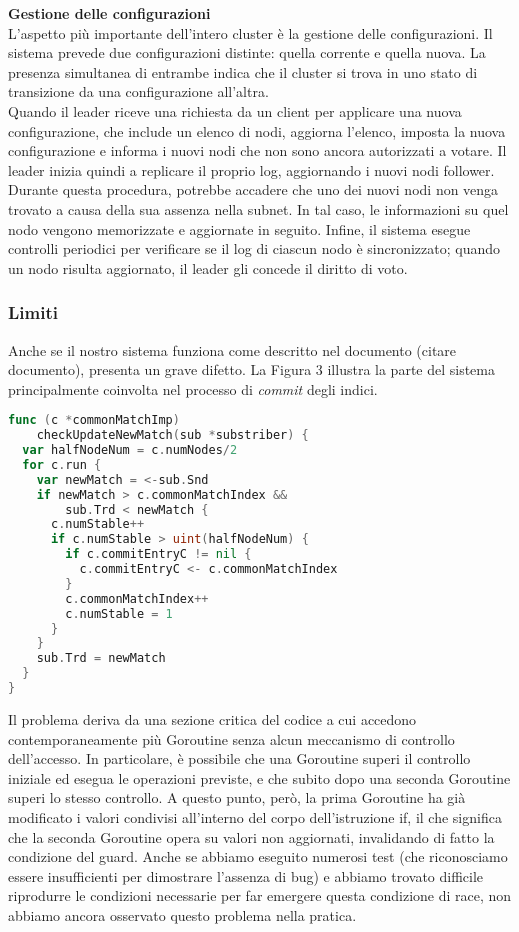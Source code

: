 \textbf{Gestione delle configurazioni}\\
L'aspetto più importante dell'intero cluster è la gestione delle configurazioni. Il sistema prevede due configurazioni distinte: quella corrente e quella nuova. La presenza simultanea di entrambe indica che il cluster si 
trova in uno stato di transizione da una configurazione all'altra.\\
Quando il leader riceve una richiesta da un client per applicare una nuova configurazione, che include un elenco di nodi, aggiorna l'elenco, imposta la nuova configurazione e informa i nuovi nodi che non sono ancora autorizzati
a votare. Il leader inizia quindi a replicare il proprio log, aggiornando i nuovi nodi follower.\\
Durante questa procedura, potrebbe accadere che uno dei nuovi nodi non venga trovato a causa della sua assenza nella subnet. In tal caso, le informazioni su quel nodo vengono memorizzate e aggiornate in seguito. Infine, 
il sistema esegue controlli periodici per verificare se il log di ciascun nodo è sincronizzato; quando un nodo risulta aggiornato, il leader gli concede il diritto di voto.

\subsubsection{Limiti}
Anche se il nostro sistema funziona come descritto nel documento (citare documento), presenta un grave difetto. La Figura 3 illustra la parte del sistema principalmente coinvolta nel processo di \textit{commit} degli indici.
\\
\begin{lstlisting}[language=Go]
func (c *commonMatchImp) 
    checkUpdateNewMatch(sub *substriber) { 
  var halfNodeNum = c.numNodes/2 
  for c.run { 
    var newMatch = <-sub.Snd 
    if newMatch > c.commonMatchIndex && 
        sub.Trd < newMatch { 
      c.numStable++ 
      if c.numStable > uint(halfNodeNum) {
        if c.commitEntryC != nil {
          c.commitEntryC <- c.commonMatchIndex
        } 
        c.commonMatchIndex++
        c.numStable = 1
      } 
    } 
    sub.Trd = newMatch
  } 
}
\end{lstlisting}
Il problema deriva da una sezione critica del codice a cui accedono contemporaneamente più Goroutine senza alcun meccanismo di controllo dell'accesso. In particolare, è possibile che una Goroutine 
superi il controllo iniziale ed esegua le operazioni previste, e che subito dopo una seconda Goroutine superi lo stesso controllo. A questo punto, però, la prima Goroutine ha già modificato i valori condivisi all'interno del 
corpo dell'istruzione if, il che significa che la seconda Goroutine opera su valori non aggiornati, invalidando di fatto la condizione del guard. Anche se abbiamo eseguito numerosi test (che riconosciamo essere insufficienti 
per dimostrare l'assenza di bug) e abbiamo trovato difficile riprodurre le condizioni necessarie per far emergere questa condizione di race, non abbiamo ancora osservato questo problema nella pratica.
